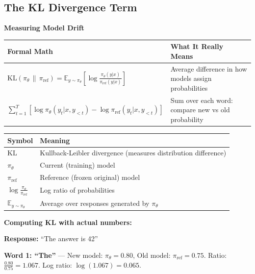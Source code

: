 \begin{chapterenv}
\subsection{The KL Divergence Term}

\begin{infobox}
\textbf{Measuring Model Drift}

\begin{center}
\begin{tabular}{p{}p{}}
\toprule
\textbf{Formal Math} & \textbf{What It Really Means} \\
\midrule
$\text{KL}(\pi_\theta \,\|\, \pi_{\text{ref}}) = \mathbb{E}_{y \sim \pi_\theta}\!\left[\log \frac{\pi_\theta(y|x)}{\pi_{\text{ref}}(y|x)}\right]$ & Average difference in how models assign probabilities \\
\midrule
$\sum_{t=1}^T \left[\log \pi_\theta(y_t|x,y_{<t}) - \log \pi_{\text{ref}}(y_t|x,y_{<t})\right]$ & Sum over each word: compare new vs old probability \\
\bottomrule
\end{tabular}
\end{center}

\begin{center}
\begin{tabular}{p{}p{}}
\toprule
\textbf{Symbol} & \textbf{Meaning} \\
\midrule
$\text{KL}$ & Kullback-Leibler divergence (measures distribution difference) \\
$\pi_\theta$ & Current (training) model \\
$\pi_{\text{ref}}$ & Reference (frozen original) model \\
$\log \frac{\pi_\theta}{\pi_{\text{ref}}}$ & Log ratio of probabilities \\
$\mathbb{E}_{y \sim \pi_\theta}$ & Average over responses generated by $\pi_\theta$ \\
\bottomrule
\end{tabular}
\end{center}
\end{infobox}

\textbf{Computing KL with actual numbers:}

\textbf{Response:} ``The answer is 42''

\textbf{Word 1: ``The''} --- New model: $\pi_\theta = 0.80$, Old model: $\pi_{\text{ref}} = 0.75$. Ratio: $\frac{0.80}{0.75} = 1.067$. Log ratio: $\log(1.067) = 0.065$.


\end{chapterenv}
